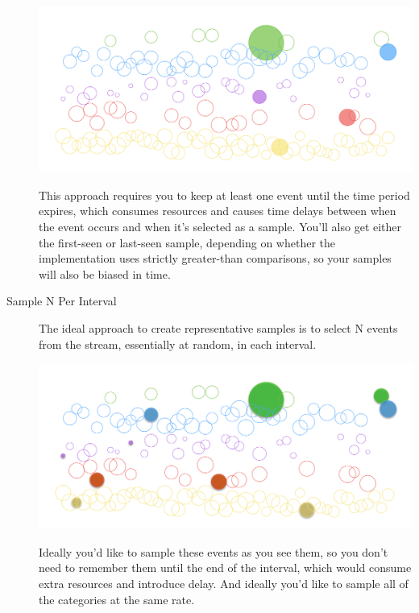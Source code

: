 \documentclass{vivid_layout}
\begin{document}
\begin{description}
\begin{center}
\includegraphics[width=\linewidth]{sketch-sampling/select-extreme-sample}
\end{center}

This approach requires you to keep at least one event until the time period
expires, which consumes resources and causes time delays between when the event
occurs and when it's selected as a sample.  You'll also get either the
first-seen or last-seen sample, depending on whether the implementation uses
strictly greater-than comparisons, so your samples will also be biased in time.

\item[Sample N Per Interval] The ideal approach to create representative samples
is to select N events from the stream, essentially at random, in each interval.

\begin{center}
\includegraphics[width=\linewidth]{sketch-sampling/select-n-per-interval}
\end{center}

Ideally you'd like to sample these events as you see them, so you don't need to
remember them until the end of the interval, which would consume extra resources
and introduce delay. And ideally you'd like to sample all of the categories at
the same rate.

\end{description}
\end{document}
